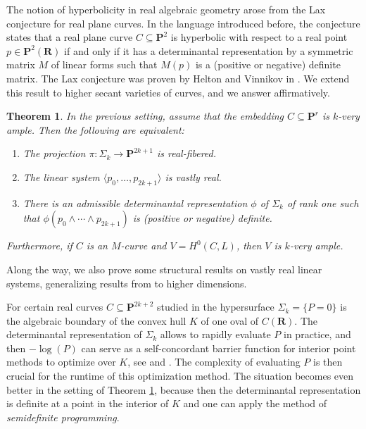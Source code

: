 \documentclass[12pt]{amsart}
\newcounter{conj}
\newtheorem{introthm}{Theorem}
\numberwithin{equation}{section}
\numberwithin{thmcounter}{section}
\theoremstyle{definition}
\theoremstyle{claim}
\newcommand{\nR}{\mathbf{R}}
\newcommand{\nP}{\mathbf{P}}
\begin{document}
\medskip

The notion of hyperbolicity in real algebraic geometry arose from the Lax conjecture for real plane curves. In the language introduced before, the conjecture states that a real plane curve $C\subseteq \nP^2$ is hyperbolic with respect to a real point $p\in \nP^2(\nR)$ if and only if it has a determinantal representation by a symmetric matrix $M$ of linear forms such that $M(p)$ is a (positive or negative) definite matrix. The Lax conjecture was proven by Helton and Vinnikov in \cite{heltonvinnikov}. We extend this result to higher secant varieties of curves, and we answer \cite[Question (4)]{kummersinn} affirmatively.

\begin{introthm}\label{thm:thmD}
	In the previous setting, assume that the embedding $C\subseteq \nP^r$ is $k$-very ample. Then the following are equivalent:
	\begin{enumerate}
		\item The projection $\pi\colon \Sigma_k \rightarrow \nP^{2k+1}$ is real-fibered.
		\item The linear system $\langle p_0,\ldots,p_{2k+1} \rangle$ is vastly real.
		\item There is an admissible determinantal representation $\phi$ of $\Sigma_k$ of rank one such that $\phi(p_0\wedge \cdots \wedge p_{2k+1})$ is (positive or negative) definite. 
	\end{enumerate}
	Furthermore, if $C$ is an $M$-curve and $V=H^0(C,L)$, then $V$ is $k$-very ample.
\end{introthm} 

Along the way, we also prove some structural results on vastly real linear systems, generalizing results from \cite{mikhalkinorevkov} to higher dimensions.

\medskip

For certain real curves $C\subseteq \nP^{2k+2}$ studied in \cite{kummersinn} the hypersurface $\Sigma_k = \{P=0\}$ is the algebraic boundary of the convex hull $K$ of one oval of $C(\nR)$. The determinantal representation of $\Sigma_k$ allows to rapidly evaluate $P$ in practice, and then $-\log(P)$ can serve as a   self-concordant barrier function for interior point methods to optimize over $K$, see \cite[Section 4]{kummersinn} and \cite{guler}. The complexity of evaluating $P$ is then crucial for the runtime of this optimization method. The situation becomes even better in the setting of Theorem \ref{thm:thmD}, because then the determinantal representation is definite at a point in the interior of $K$ and one can apply the method of \emph{semidefinite programming}.
\end{document}
